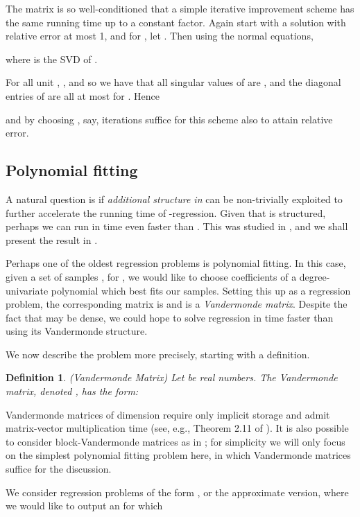 \documentclass[11pt]{article}
\newtheorem{definition}[theorem]{Definition}
\begin{document}
The matrix  is so well-conditioned that a simple iterative improvement scheme
has the same running time up to a constant factor. Again start with a solution  with 
relative error at most 1, and for ,
let .
Then using the normal equations,

where  is the SVD of .

For all unit ,
, and so
we have that all singular values  of  are ,
and the diagonal entries of 
are all at most  for 
. Hence 

and by choosing , say,  iterations suffice for this
scheme also to attain  relative error.

\subsection{Polynomial fitting}\label{sec:polynomialFit}
A natural question is if {\it additional structure in } can be non-trivially exploited
to further accelerate the running time of -regression. Given that  is structured,
perhaps we can run in time even faster than . This was studied in \cite{asw13,anw14},
and we shall present the result in \cite{asw13}. 

Perhaps one of the oldest
regression problems is polynomial fitting. In this case, given a set of samples 
, for , we would like to
choose coefficients  of a degree- univariate polynomial
 which best fits our samples. Setting this up as a regression
problem, the corresponding matrix  is  and is a {\it Vandermonde matrix}.
Despite the fact that  may be dense, we could hope to solve regression in time faster
than  using its Vandermonde structure. 

We now describe the problem more precisely, starting with a definition. 

\begin{definition}(Vandermonde Matrix) Let  be real numbers. The Vandermonde matrix,
denoted , has the form:

\end{definition}

Vandermonde matrices of dimension  require only 
implicit storage and admit  matrix-vector multiplication time (see, e.g., Theorem 2.11 of \cite{Tang2004}). 
It is also possible to consider block-Vandermonde matrices as in \cite{asw13}; for simplicity
we will only focus on the simplest polynomial fitting problem here, in which Vandermonde
matrices suffice for the discussion. 

We consider regression problems of the form , or the approximate version,
where we would like to output an  for which 
\end{document}
